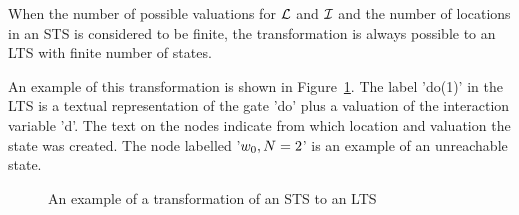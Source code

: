 When the number of possible valuations for $\mathcal{L}$ and $\mathcal{I}$ and the number of locations in an STS is considered to be finite, the transformation is always possible to an LTS with finite number of states.

An example of this transformation is shown in Figure~\ref{fig:example_trafo}. The label 'do(1)' in the LTS is a textual representation of the gate 'do' plus a valuation of the interaction variable 'd'. The text on the nodes indicate from which location and valuation the state was created. The node labelled '$w_0, N=2$' is an example of an unreachable state.  %

\begin{figure}[ht]
  \begin{center}
    \hspace{20px}
  \end{center}
  \caption{An example of a transformation of an STS to an LTS}
  \label{fig:example_trafo}
\end{figure}

